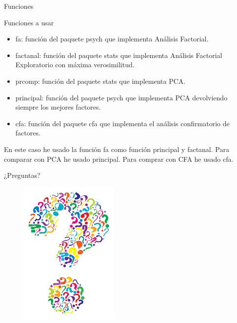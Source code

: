 \documentclass[10pt]{beamer}
\begin{document}
\begin{frame}[fragile]{Funciones}
\vspace{10px}
\pause
{}
\begin{block}{Funciones a usar}
	\begin{itemize}
		\item fa: función del paquete psych que implementa Análisis Factorial.
		\pause
		\item factanal: función del paquete stats que implementa Análisis Factorial Exploratorio con máxima verosimilitud.
		\pause
		\item prcomp: función del paquete stats que implementa PCA.
		\pause
		\item principal: función del paquete psych que implementa PCA devolviendo siempre los mejores factores.
		\item cfa: función del paquete cfa que implementa el análisis confirmatorio de factores.
		\pause
	\end{itemize}
	En este caso he usado la función fa como función principal y factanal. Para comparar con PCA he usado principal. Para comprar con CFA he usado cfa.
\end{block}
\end{frame}

\begin{frame}[standout]
	\LARGE{¿Preguntas?}
	\vspace{10px}
	\begin{figure}
		\includegraphics[scale=0.5]{./Imagenes/preguntas.png}
	\end{figure}
\end{frame}
\end{document}
